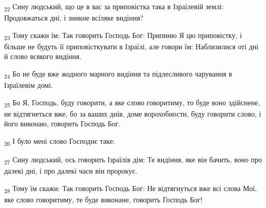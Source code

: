 \begin{tcolorbox}
\textsubscript{22} Сину людський, що це в вас за приповістка така в Ізраїлевій землі: Продовжаться дні, і зникне всіляке видіння?
\end{tcolorbox}
\begin{tcolorbox}
\textsubscript{23} Тому скажи їм: Так говорить Господь Бог: Припиню Я цю приповістку, і більше не будуть її приповісткувати в Ізраїлі, але говори їм: Наблизилися оті дні й слово всякого видіння.
\end{tcolorbox}
\begin{tcolorbox}
\textsubscript{24} Бо не буде вже жодного марного видіння та підлесливого чарування в Ізраїлевім домі.
\end{tcolorbox}
\begin{tcolorbox}
\textsubscript{25} Бо Я, Господь, буду говорити, а яке слово говоритиму, то буде воно здійснене, не відтягнеться вже, бо за ваших днів, доме ворохобности, буду говорити слово, і його виконаю, говорить Господь Бог.
\end{tcolorbox}
\begin{tcolorbox}
\textsubscript{26} І було мені слово Господнє таке:
\end{tcolorbox}
\begin{tcolorbox}
\textsubscript{27} Сину людський, ось говорить Ізраїлів дім: Те видіння, яке він бачить, воно про далекі дні, і про далекі часи він пророкує.
\end{tcolorbox}
\begin{tcolorbox}
\textsubscript{28} Тому їм скажи: Так говорить Господь Бог: Не відтягнуться вже всі слова Мої, яке слово говоритиму, те буде виконане, говорить Господь Бог!
\end{tcolorbox}
